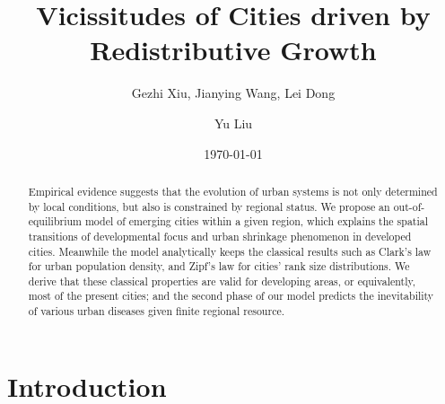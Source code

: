 \documentclass[reprint,unsortedaddress,amsmath,amssymb,aps,prl,showkeys]{revtex4-2}
\begin{document}
\title{Vicissitudes of Cities driven by Redistributive Growth}
\author{Gezhi Xiu, Jianying Wang, Lei Dong}
\author{Yu Liu}
\date{\today}

\begin{abstract}
    Empirical evidence suggests that the evolution of urban systems is not only determined by local conditions, but also is constrained by regional status. We propose an out-of-equilibrium model of emerging cities within a given region, which explains the spatial transitions of developmental focus and urban shrinkage phenomenon in developed cities. Meanwhile the model analytically keeps the classical results such as Clark's law for urban population density, and Zipf's law for cities' rank size distributions. We derive that these classical properties are valid for developing areas, or equivalently, most of the present cities; and the second phase of our model predicts the inevitability of various urban diseases given finite regional resource. 
\end{abstract}
\maketitle
\section{Introduction}
\end{document}
